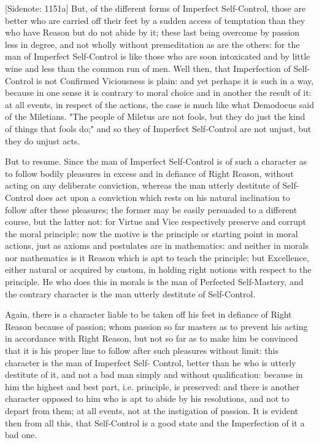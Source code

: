 [Sidenote: 1151a] But, of the different forms of Imperfect Self-Control,
those are better who are carried off their feet by a sudden access of
temptation than they who have Reason but do not abide by it; these
last being overcome by passion less in degree, and not wholly without
premeditation as are the others: for the man of Imperfect Self-Control
is like those who are soon intoxicated and by little wine and less than
the common run of men. Well then, that Imperfection of Self-Control is
not Confirmed Viciousness is plain: and yet perhaps it is such in a way,
because in one sense it is contrary to moral choice and in another the
result of it: at all events, in respect of the actions, the case is much
like what Demodocus said of the Miletians. "The people of Miletus are
not fools, but they do just the kind of things that fools do;" and so
they of Imperfect Self-Control are not unjust, but they do unjust acts.

But to resume. Since the man of Imperfect Self-Control is of such a
character as to follow bodily pleasures in excess and in defiance of
Right Reason, without acting on any deliberate conviction, whereas the
man utterly destitute of Self-Control does act upon a conviction which
rests on his natural inclination to follow after these pleasures; the
former may be easily persuaded to a different course, but the latter
not: for Virtue and Vice respectively preserve and corrupt the moral
principle; now the motive is the principle or starting point in moral
actions, just as axioms and postulates are in mathematics: and neither
in morals nor mathematics is it Reason which is apt to teach the
principle; but Excellence, either natural or acquired by custom, in
holding right notions with respect to the principle. He who does this in
morals is the man of Perfected Self-Mastery, and the contrary character
is the man utterly destitute of Self-Control.

Again, there is a character liable to be taken off his feet in defiance
of Right Reason because of passion; whom passion so far masters as to
prevent his acting in accordance with Right Reason, but not so far as to
make him be convinced that it is his proper line to follow after such
pleasures without limit: this character is the man of Imperfect Self-
Control, better than he who is utterly destitute of it, and not a bad
man simply and without qualification: because in him the highest and
best part, i.e. principle, is preserved: and there is another character
opposed to him who is apt to abide by his resolutions, and not to depart
from them; at all events, not at the instigation of passion. It is
evident then from all this, that Self-Control is a good state and the
Imperfection of it a bad one.

